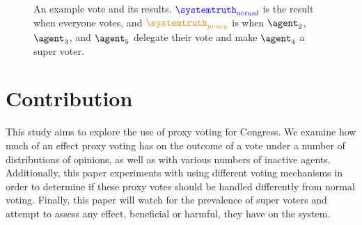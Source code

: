 \begin{figure}[htbp]
    \centering

    \caption{
        An example vote and its results.
        $\textcolor{blue}{\systemtruth_{actual}}$ is the result when everyone votes,
        and $\textcolor{orange}{\systemtruth_{proxy}}$ is when $\agent_2$, $\agent_3$,
        and $\agent_5$ delegate their vote and make $\agent_4$ a super voter.
    }
    \label{fig:voting-example}
\end{figure}


\section{Contribution}\label{sec:contribution}
This study aims to explore the use of proxy voting for Congress.
We examine how much of an effect proxy voting has on the outcome of a vote under a
number of distributions of opinions, as well as with various numbers of inactive
agents.
Additionally, this paper experiments with using different voting mechanisms in order
to determine if these proxy votes should be handled differently from normal voting.
Finally, this paper will watch for the prevalence of super voters and attempt to
assess any effect, beneficial or harmful, they have on the system.

